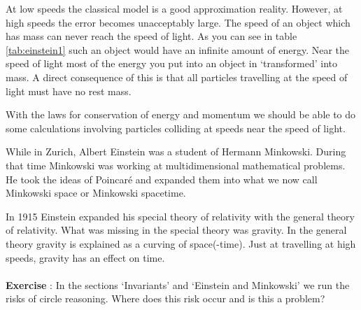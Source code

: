 At low speeds the classical model is a good approximation reality. However, at high speeds the error becomes unacceptably large. The speed of an object which has mass can never reach the speed of light. As you can see in table \ref{tab:einstein1} such an object would have an infinite amount of energy. Near the speed of light most of the energy you put into an object in `transformed' into mass. A direct consequence of this is that all particles travelling at the speed of light must have no rest mass.

With the laws for conservation of energy and momentum we should be able to do some calculations involving particles colliding at speeds near the speed of light.

While in Zurich, Albert Einstein was a student of Hermann Minkowski. During that time Minkowski was working at multidimensional mathematical problems. He took the ideas of Poincar\'e and expanded them into what we now call Minkowski space or Minkowski spacetime.

In 1915 Einstein expanded his special theory of relativity with the general theory of relativity. What was missing in the special theory was gravity. In the general theory gravity is explained as a curving of space(-time). Just at travelling at high speeds, gravity has an effect on time.

\paragraph{} \textbf{Exercise \theExercise {}} : In the sections `Invariants' and `Einstein and Minkowski' we run the risks of circle reasoning. Where does this risk occur and is this a problem?

